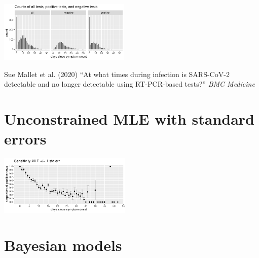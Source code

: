 \documentclass[plainboxedsections]{sciposter}
\begin{document}
\begin{multicols}{2}
\begin{center}
  \includegraphics[width=0.47\textwidth]{img/data-counts.pdf}
\end{center}

{\small Sue Mallet et al. (2020) ``At what times during infection is SARS-CoV-2 detectable and no longer detectable using RT-PCR-based tests?'' {\slshape BMC Medicine}}

\section{Unconstrained MLE with standard errors}


\begin{center}
\includegraphics[width=0.475\textwidth]{img/mle.pdf}
\end{center}

\columnbreak

\section{Bayesian models}
\newcommand{\ilogit}{\textrm{logit}^{-1}}


\end{multicols}
\end{document}
